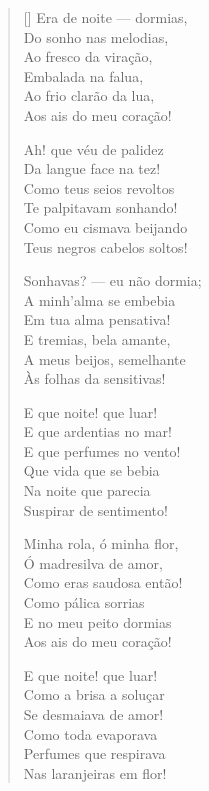 \documentclass[12pt]{book}
\begin{document}
					\begin{verse}[\versewidth]
						Era de noite — dormias, \\
						Do sonho nas melodias, \\
						Ao fresco da viração, \\
						Embalada na falua, \\
						Ao frio clarão da lua, \\
						Aos ais do meu coração!
						
						Ah! que véu de palidez \\
						Da langue face na tez! \\
						Como teus seios revoltos \\
						Te palpitavam sonhando! \\
						Como eu cismava beijando \\
						Teus negros cabelos soltos!
						
						Sonhavas? — eu não dormia; \\
						A minh'alma se embebia \\
						Em tua alma pensativa! \\
						E tremias, bela amante, \\
						A meus beijos, semelhante \\
						Às folhas da sensitivas!
						
						E que noite! que luar! \\
						E que ardentias no mar! \\
						E que perfumes no vento! \\
						Que vida que se bebia \\
						Na noite que parecia \\
						Suspirar de sentimento!
						
						Minha rola, ó minha flor, \\
						Ó madresilva de amor, \\
						Como eras saudosa então! \\
						Como pálica sorrias \\
						E no meu peito dormias \\
						Aos ais do meu coração!
						
						E que noite! que luar! \\
						Como a brisa a soluçar \\
						Se desmaiava de amor! \\
						Como toda evaporava \\
						Perfumes que respirava \\
						Nas laranjeiras em flor!
						

\end{verse}
\end{document}
